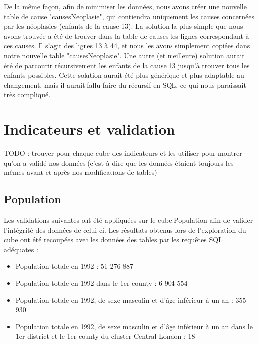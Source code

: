     De la même façon, afin de minimiser les données, nous avons créer une nouvelle table de cause "causesNeoplasie", qui contiendra uniquement les causes concernées par les néoplasies (enfants de la cause 13). La solution la plus simple que nous avons trouvée a été de trouver dans la table de causes les lignes correspondant à ces causes. Il s'agit des lignes 13 à 44, et nous les avons simplement copiées dans notre nouvelle table "causesNeoplasie". Une autre (et meilleure) solution aurait été de parcourir récursivement les enfants de la cause 13 jusqu'à trouver tous les enfants possibles. Cette solution aurait été plus générique et plus adaptable au changement, mais il aurait fallu faire du récursif en SQL, ce qui nous paraissait très compliqué.


\pagebreak

\chapter{Indicateurs et validation}

TODO : trouver pour chaque cube des indicateurs et les utiliser pour montrer qu'on a validé nos données (c'est-à-dire que les données étaient toujours les mêmes avant et après nos modifications de tables)

\section{Population}
Les validations suivantes ont été appliquées sur le cube Population afin de valider l'intégrité des données de celui-ci. Les résultats obtenus lors de l'exploration du cube ont été recoupées avec les données des tables par les requêtes SQL adéquates :
\begin{itemize}
    \item Population totale en 1992 : 51 276 887
    \item Population totale en 1992 dans le 1er county : 6 904 554
    \item Population totale en 1992, de sexe masculin et d'âge inférieur à un an : 355 930
    \item Population totale en 1992, de sexe masculin et d'âge inférieur à un an dans le 1er district et le 1er county du cluster Central London : 18
\end{itemize}


\pagebreak
